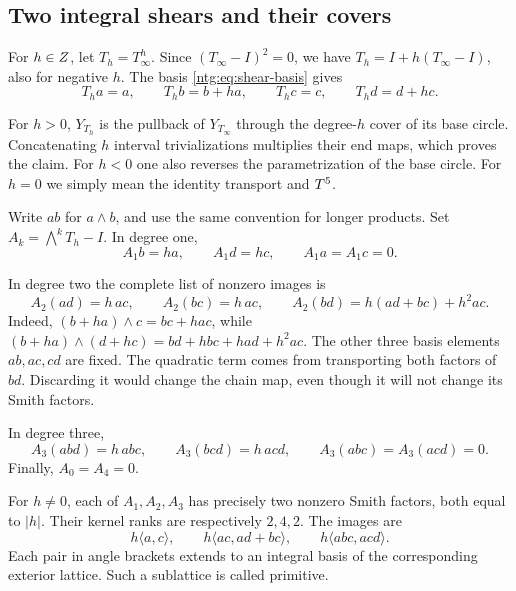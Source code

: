 \subsection{Two integral shears and their covers}\label{ntg:sec:shears}

For $h\in Z$, let $T_h=T_\infty^h$. Since
$(T_\infty-I)^2=0$, we have $T_h=I+h(T_\infty-I)$, also for
negative $h$. The basis \eqref{ntg:eq:shear-basis} gives
\[
 T_ha=a,\qquad T_hb=b+ha,\qquad
 T_hc=c,\qquad T_hd=d+hc.
\]

For $h>0$, $Y_{T_h}$ is the pullback of $Y_{T_\infty}$ through
the degree-$h$ cover of its base circle. Concatenating $h$ interval
trivializations multiplies their end maps, which proves the claim.
For $h<0$ one also reverses the parametrization of the base circle.
For $h=0$ we simply mean the identity transport and $T^5$.

Write $ab$ for $a\wedge b$, and use the same convention for longer
products. Set $A_k=\bigwedge^kT_h-I$. In degree one,
\begin{equation}\label{ntg:eq:degreeone}
 A_1b=ha,\qquad A_1d=hc,\qquad A_1a=A_1c=0.
\end{equation}

In degree two the complete list of nonzero images is
\begin{equation}\label{ntg:eq:degreetwo}
 A_2(ad)=h\,ac,\qquad A_2(bc)=h\,ac,
 \qquad A_2(bd)=h(ad+bc)+h^2ac.
\end{equation}
Indeed, $(b+ha)\wedge c=bc+hac$, while
$(b+ha)\wedge(d+hc)=bd+hbc+had+h^2ac$.
The other three basis elements $ab,ac,cd$ are fixed. The quadratic
term comes from transporting both factors of $bd$. Discarding it
would change the chain map, even though it will not change its Smith
factors.

In degree three,
\begin{equation}\label{ntg:eq:degreethree}
 A_3(abd)=h\,abc,\qquad A_3(bcd)=h\,acd,
 \qquad A_3(abc)=A_3(acd)=0.
\end{equation}
Finally, $A_0=A_4=0$.

\begin{lemma}\label{ntg:lem:shear-smith}
For $h\ne0$, each of $A_1,A_2,A_3$ has precisely two nonzero
Smith factors, both equal to $|h|$. Their kernel ranks are respectively
$2,4,2$. The images are
\[
 h\langle a,c\rangle,\qquad
 h\langle ac,ad+bc\rangle,\qquad
 h\langle abc,acd\rangle.
\]
Each pair in angle brackets extends to an integral basis of the
corresponding exterior lattice. Such a sublattice is called primitive.
\end{lemma}

